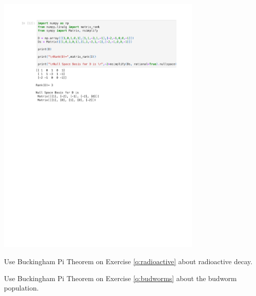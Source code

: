 \begin{solution}
\begin{slide}
\includegraphics[width=0.75\textwidth]{python/sphere-dimensionanalysis.pdf}

	
\end{slide}
\end{solution}


\begin{slide}

\question

\begin{parts}
	\item Use Buckingham Pi Theorem on Exercise \ref{q:radioactive} about radioactive decay.
	\item Use Buckingham Pi Theorem on Exercise \ref{q:budworms} about the budworm population.
\end{parts}
	
\end{slide}






